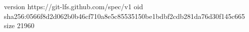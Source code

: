 version https://git-lfs.github.com/spec/v1
oid sha256:0566f8d2d062b0b46cf710a8e5c85535150be1bdbf2cdb281da76d30f145c665
size 21960
